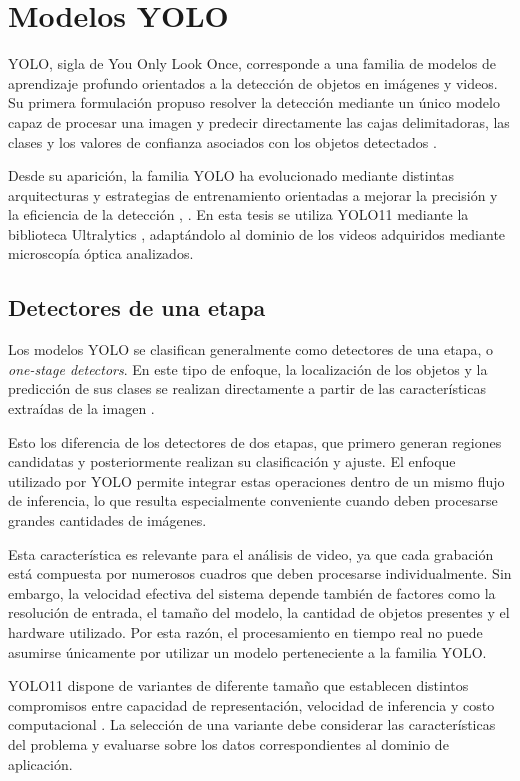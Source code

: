 \section{Modelos YOLO}

YOLO, sigla de You Only Look Once, corresponde a una familia de modelos de aprendizaje profundo orientados a la detección de objetos en imágenes y videos. Su primera formulación propuso resolver la detección mediante un único modelo capaz de procesar una imagen y predecir directamente las cajas delimitadoras, las clases y los valores de confianza asociados con los objetos detectados \cite{redmon2016}.

Desde su aparición, la familia YOLO ha evolucionado mediante distintas arquitecturas y estrategias de entrenamiento orientadas a mejorar la precisión y la eficiencia de la detección \cite{redmon2017}, \cite{redmon2018}. En esta tesis se utiliza YOLO11 mediante la biblioteca Ultralytics \cite{jocher2024}, adaptándolo al dominio de los videos adquiridos mediante microscopía óptica analizados.

\subsection{Detectores de una etapa}

Los modelos YOLO se clasifican generalmente como detectores de una etapa, o \textit{one-stage detectors}. En este tipo de enfoque, la localización de los objetos y la predicción de sus clases se realizan directamente a partir de las características extraídas de la imagen \cite{redmon2016}.

Esto los diferencia de los detectores de dos etapas, que primero generan regiones candidatas y posteriormente realizan su clasificación y ajuste. El enfoque utilizado por YOLO permite integrar estas operaciones dentro de un mismo flujo de inferencia, lo que resulta especialmente conveniente cuando deben procesarse grandes cantidades de imágenes.

Esta característica es relevante para el análisis de video, ya que cada grabación está compuesta por numerosos cuadros que deben procesarse individualmente. Sin embargo, la velocidad efectiva del sistema depende también de factores como la resolución de entrada, el tamaño del modelo, la cantidad de objetos presentes y el hardware utilizado. Por esta razón, el procesamiento en tiempo real no puede asumirse únicamente por utilizar un modelo perteneciente a la familia YOLO.

YOLO11 dispone de variantes de diferente tamaño que establecen distintos compromisos entre capacidad de representación, velocidad de inferencia y costo computacional \cite{jocher2024}. La selección de una variante debe considerar las características del problema y evaluarse sobre los datos correspondientes al dominio de aplicación.

